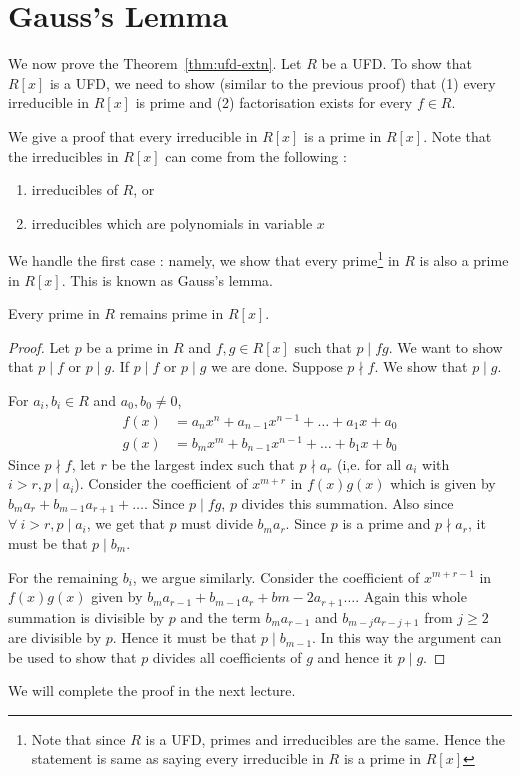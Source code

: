 \section{Gauss's Lemma}
We now prove the Theorem~\ref{thm:ufd-extn}. Let $R$ be a UFD. 
To show that $R[x]$ is a UFD, we need to show (similar to the previous proof)
that (1) every irreducible in $R[x]$ is prime and (2) factorisation exists for
every $f \in R$.

We give a proof that every irreducible in $R[x]$ is a prime in $R[x]$.
Note that the irreducibles in $R[x]$ can come from the following :
\begin{enumerate}
	\item irreducibles of $R$, or
	\item irreducibles which are polynomials in variable $x$
\end{enumerate}
We handle the first case : namely, we show that every prime\footnote{Note that
since $R$ is a UFD, primes and irreducibles are the same. Hence the statement
is same as saying every irreducible in $R$ is a prime in $R[x]$} in $R$ is
also a prime in $R[x]$. This is known as Gauss's lemma.

\begin{lemma}\label{lem:gauss}
	Every prime in $R$ remains prime in $R[x]$.
\end{lemma}
\begin{proof}
	Let $p$ be a prime in $R$ and $f,g \in R[x]$ such that $p \mid fg$. We
	want to show that $p \mid f$ or $p \mid g$. If $p \mid f$ or $p \mid
	g$ we are done. Suppose $p \nmid f$. We show that $p \mid g$.

	For $a_i, b_i \in R$ and $a_0, b_0 \ne 0$,
	\begin{align*}
		f(x) & = a_nx^n + a_{n-1}x^{n-1} + \ldots + a_1x + a_0 \\
		g(x) & = b_mx^m + b_{n-1}x^{n-1} + \ldots + b_1x + b_0 
	\end{align*}
	Since $p \nmid f$, let $r$ be the largest index such that $p \nmid
	a_r$ (i,e. for all $a_i$ with $i > r, p \mid a_i$). Consider the
	coefficient of $x^{m+r}$ in $f(x)g(x)$ which is given by $b_ma_r +
	b_{m-1}a_{r+1} + \ldots$. Since $p \mid fg$, $p$ divides this
	summation. Also since $\forall~i > r, p \mid a_i$, we get that $p$
	must divide $b_ma_r$. Since $p$ is a prime and $p \nmid a_r$, it must
	be that $p \mid b_m$. 
	
	For the remaining $b_i$, we argue similarly. Consider the coefficient
	of $x^{m+r-1}$ in $f(x)g(x)$ given by $b_ma_{r-1} + b_{m-1}a_r +
	b{m-2}a_{r+1} \ldots$. Again this whole summation is divisible by $p$
	and the term $b_ma_{r-1}$ and $b_{m-j}a_{r-j+1}$ from $j \ge 2$ are
	divisible by $p$. Hence it must be that $p \mid b_{m-1}$. In this way
	the argument can be used to show that $p$ divides all coefficients of
	$g$ and hence it $p \mid g$.
\end{proof}
We will complete the proof in the next lecture.

